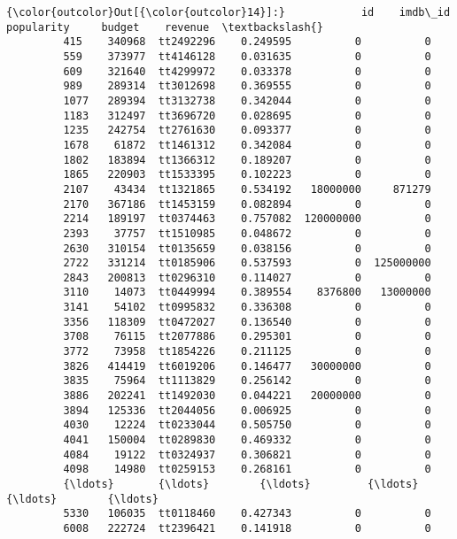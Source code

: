 \documentclass[11pt]{article}
\begin{document}
\begin{Verbatim}[commandchars=\\\{\}]
{\color{outcolor}Out[{\color{outcolor}14}]:}            id    imdb\_id  popularity     budget    revenue  \textbackslash{}
         415    340968  tt2492296    0.249595          0          0   
         559    373977  tt4146128    0.031635          0          0   
         609    321640  tt4299972    0.033378          0          0   
         989    289314  tt3012698    0.369555          0          0   
         1077   289394  tt3132738    0.342044          0          0   
         1183   312497  tt3696720    0.028695          0          0   
         1235   242754  tt2761630    0.093377          0          0   
         1678    61872  tt1461312    0.342084          0          0   
         1802   183894  tt1366312    0.189207          0          0   
         1865   220903  tt1533395    0.102223          0          0   
         2107    43434  tt1321865    0.534192   18000000     871279   
         2170   367186  tt1453159    0.082894          0          0   
         2214   189197  tt0374463    0.757082  120000000          0   
         2393    37757  tt1510985    0.048672          0          0   
         2630   310154  tt0135659    0.038156          0          0   
         2722   331214  tt0185906    0.537593          0  125000000   
         2843   200813  tt0296310    0.114027          0          0   
         3110    14073  tt0449994    0.389554    8376800   13000000   
         3141    54102  tt0995832    0.336308          0          0   
         3356   118309  tt0472027    0.136540          0          0   
         3708    76115  tt2077886    0.295301          0          0   
         3772    73958  tt1854226    0.211125          0          0   
         3826   414419  tt6019206    0.146477   30000000          0   
         3835    75964  tt1113829    0.256142          0          0   
         3886   202241  tt1492030    0.044221   20000000          0   
         3894   125336  tt2044056    0.006925          0          0   
         4030    12224  tt0233044    0.505750          0          0   
         4041   150004  tt0289830    0.469332          0          0   
         4084    19122  tt0324937    0.306821          0          0   
         4098    14980  tt0259153    0.268161          0          0   
         {\ldots}       {\ldots}        {\ldots}         {\ldots}        {\ldots}        {\ldots}   
         5330   106035  tt0118460    0.427343          0          0   
         6008   222724  tt2396421    0.141918          0          0   

\end{Verbatim}
\end{document}
